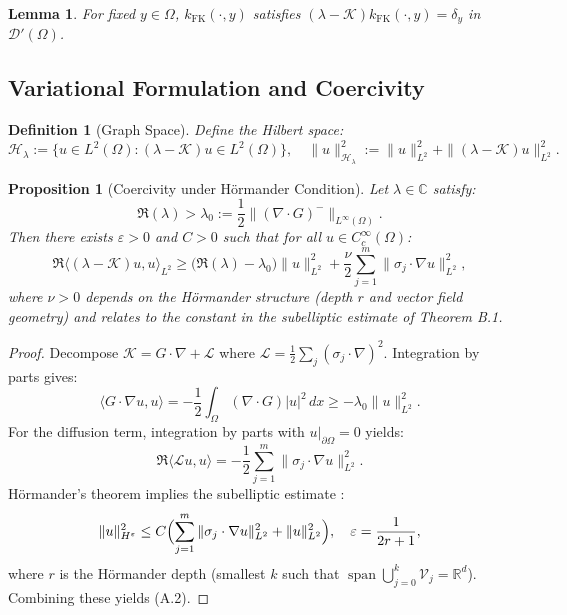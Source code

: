 \documentclass[11pt,a4paper]{article}
\newtheorem{lemma}[theorem]{Lemma}
\newtheorem{proposition}[theorem]{Proposition}
\newtheorem{definition}[theorem]{Definition}
\begin{document}
\begin{lemma}
For fixed $y \in \Omega$, $k_{\mathrm{FK}}(\cdot,y)$ satisfies $(\lambda - \mathcal{K})k_{\mathrm{FK}}(\cdot,y) = \delta_y$ in $\mathcal{D}'(\Omega)$.
\end{lemma}

\subsection{Variational Formulation and Coercivity}

\begin{definition}[Graph Space]
Define the Hilbert space:
\[
\mathcal{H}_\lambda := \{u \in L^2(\Omega) : (\lambda - \mathcal{K})u \in L^2(\Omega)\},
\quad
\|u\|_{\mathcal{H}_\lambda}^2 := \|u\|_{L^2}^2 + \|(\lambda - \mathcal{K})u\|_{L^2}^2.
\]
\end{definition}

\begin{proposition}[Coercivity under H\"{o}rmander Condition]
Let $\lambda \in \mathbb{C}$ satisfy:
\[
\Re(\lambda) > \lambda_0 := \frac{1}{2}\|(\nabla \cdot G)^-\|_{L^\infty(\Omega)}.
\tag{A.1}
\]
Then there exists $\varepsilon > 0$ and $C > 0$ such that for all $u \in C_c^\infty(\Omega)$:
\[
\Re\langle (\lambda - \mathcal{K})u, u \rangle_{L^2}
\geq \bigl(\Re(\lambda) - \lambda_0\bigr)\|u\|_{L^2}^2 + \frac{\nu}{2}\sum_{j=1}^m \|\sigma_j \cdot \nabla u\|_{L^2}^2,
\tag{A.2}
\]
where $\nu > 0$ depends on the H\"{o}rmander structure (depth $r$ and vector field geometry) and relates to the constant in the subelliptic estimate of Theorem B.1.
\end{proposition}

\begin{proof}
Decompose $\mathcal{K} = G\cdot\nabla + \mathcal{L}$ where $\mathcal{L} = \frac{1}{2}\sum_j (\sigma_j\cdot\nabla)^2$. Integration by parts gives:
\[
\langle G\cdot\nabla u, u\rangle = -\frac{1}{2}\int_\Omega (\nabla\cdot G)|u|^2\,dx
\geq -\lambda_0 \|u\|_{L^2}^2.
\]
For the diffusion term, integration by parts with $u|_{\partial\Omega}=0$ yields:
\[
\Re\langle \mathcal{L}u, u\rangle = -\frac{1}{2}\sum_{j=1}^m \|\sigma_j \cdot \nabla u\|_{L^2}^2.
\]
H\"{o}rmander's theorem implies the subelliptic estimate \cite{RothschildStein1976}:
\[
\|u\|_{H^\varepsilon}^2 \leq C\Bigl(\sum_{j=1}^m \|\sigma_j \cdot \nabla u\|_{L^2}^2 + \|u\|_{L^2}^2\Bigr),
\quad \varepsilon = \frac{1}{2r+1},
\]
where $r$ is the H\"{o}rmander depth (smallest $k$ such that $\operatorname{span}\bigcup_{j=0}^k \mathcal{V}_j = \mathbb{R}^d$). Combining these yields (A.2).
\end{proof}
\end{document}
